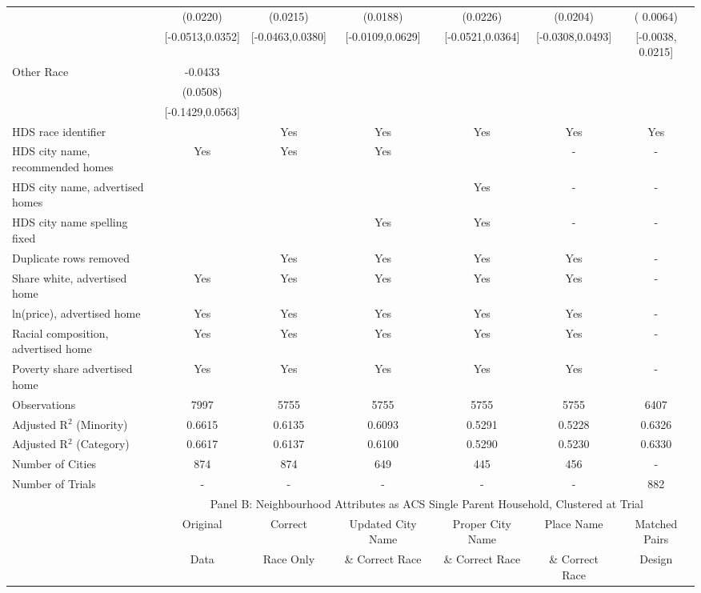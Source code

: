 \begin{table}[htbp]
{\begin{tabular}{l*{6}{c}}
 & (0.0220) & (0.0215) & (0.0188) & (0.0226) & (0.0204) & ( 0.0064) \\
 & [-0.0513,0.0352] & [-0.0463,0.0380] & [-0.0109,0.0629] & [-0.0521,0.0364] & [-0.0308,0.0493] & [-0.0038,  0.0215] \\
Other Race & -0.0433 &  &  &  &  &  \\
 & (0.0508) &  &  &  &  &  \\
 & [-0.1429,0.0563] &  &  &  &  &  \\
\midrule
HDS race identifier & & Yes & Yes & Yes & Yes & Yes \\
HDS city name, recommended homes & Yes & Yes & Yes & & - & -\\
HDS city name, advertised homes &  &  &  & Yes & - & -\\
HDS city name spelling fixed & & & Yes & Yes & - & -\\
Duplicate rows removed &  & Yes & Yes & Yes & Yes & - \\
\midrule
Share white, advertised home  & Yes & Yes & Yes & Yes & Yes & - \\
ln(price), advertised home  & Yes & Yes & Yes & Yes & Yes & - \\
Racial composition, advertised home & Yes & Yes & Yes & Yes & Yes & - \\
Poverty share advertised home & Yes & Yes & Yes & Yes & Yes & - \\
Observations & 7997 & 5755 & 5755 & 5755 & 5755 & 6407 \\
Adjusted R$^2$ (Minority) & 0.6615 & 0.6135 & 0.6093 & 0.5291 & 0.5228 & 0.6326 \\
Adjusted R$^2$ (Category) & 0.6617 & 0.6137 & 0.6100 & 0.5290 & 0.5230 & 0.6330 \\
Number of Cities & 874 & 874 & 649 & 445 & 456 & - \\
Number of Trials & - & - & - & - & - & 882 \\
\bottomrule
\toprule
& \multicolumn{6}{c}{Panel B: Neighbourhood Attributes as ACS Single Parent Household, Clustered at Trial}\\
\toprule
                    &\multicolumn{1}{c}{Original}&\multicolumn{1}{c}{Correct}&\multicolumn{1}{c}{Updated City Name}&\multicolumn{1}{c}{Proper City Name}&\multicolumn{1}{c}{Place Name}&\multicolumn{1}{c}{Matched Pairs}\\
                      &\multicolumn{1}{c}{Data}&\multicolumn{1}{c}{Race Only}&\multicolumn{1}{c}{\& Correct Race}&\multicolumn{1}{c}{\& Correct Race}&\multicolumn{1}{c}{\& Correct Race}&\multicolumn{1}{c}{Design}\\                  

\end{tabular}}
\end{table}
